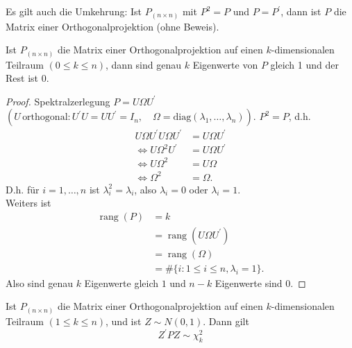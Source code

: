 \documentclass{tstextbook}
\DeclareMathOperator{\rang}{rang}
\begin{document}
\begin{remark}
	Es gilt auch die Umkehrung:
		Ist $ P_{(n \times n)} $ mit $ P^2=P $  und $ P=P^\prime $, dann ist $ P $ die Matrix einer Orthogonalprojektion (ohne Beweis).
	\end{remark}



\begin{corollary}
	
	Ist $ P_{(n\times n)} $ die Matrix einer Orthogonalprojektion auf einen $ k $-dimensionalen Teilraum $ (0 \le k \le n) $, dann sind genau $ k $ Eigenwerte von $ P $ gleich 1 und der Rest ist 0.
	
\end{corollary}

\begin{proof}
	Spektralzerlegung $ P = U \Omega U^\prime $ $ (U \, \text{orthogonal}: U^\prime U = U U^\prime = I_n, \quad \Omega = \text{diag}(\lambda_1,\ldots, \lambda_n)) $. 
	$ P^2 = P $, d.h. 
	\[
	\begin{aligned}
		U\Omega U^\prime U \Omega U^\prime & = U\Omega U^\prime \\
		\Leftrightarrow U \Omega^2 U^\prime &= U \Omega U^\prime \\
		\Leftrightarrow U \Omega^2 &= U \Omega \\
		\Leftrightarrow \Omega^2 &= \Omega.
	\end{aligned}
	\]
	D.h. für $ i=1,\ldots, n  $ ist $ \lambda_i^2 = \lambda_i $, also $ \lambda_i = 0 $ oder $ \lambda_i = 1 $. \\
	Weiters ist  
	\[
	\begin{aligned}	
	\rang(P) & = k \\
	& = \rang(U \Omega U^\prime) \\
	& = \rang(\Omega) \\
	& = \# \{i: 1\le i \le n, \lambda_i = 1\}.
	\end{aligned}
	\]  
	Also sind genau $ k $ Eigenwerte gleich $ 1 $ und $ n-k $ Eigenwerte sind $ 0 $.
\end{proof}
	

\begin{theorem}
	
		Ist $ P_{(n\times n)} $ die Matrix einer Orthogonalprojektion auf einen $ k $-dimensionalen Teilraum $ (1 \le k \le n) $, und ist $ Z \sim N\left(0,1 \right) $. Dann gilt \[ Z^\prime PZ\sim \chi_k^2 \]
	
	\end{theorem}
\end{document}
